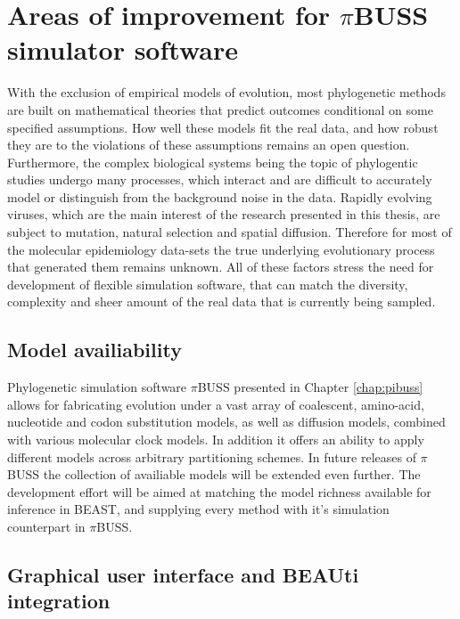 \section{Areas of improvement for $\pi$BUSS simulator software}

With the exclusion of empirical models of evolution, most phylogenetic methods are built on mathematical theories that predict outcomes conditional on some specified assumptions.
How well these models fit the real data, and how robust they are to the violations of these assumptions remains an open question.
Furthermore, the complex biological systems being the topic of phylogentic studies undergo many processes, which interact and are difficult to accurately model or distinguish from the background noise in the data.
Rapidly evolving viruses, which are the main interest of the research presented in this thesis, are subject to mutation, natural selection and spatial diffusion.
Therefore for most of the molecular epidemiology data-sets the true underlying evolutionary process that generated them remains unknown.
All of these factors stress the need for development of flexible simulation software, that can match the diversity, complexity and sheer amount of the real data that is currently being sampled.

\subsection{Model availiability}

Phylogenetic simulation software $\pi$BUSS presented in Chapter \ref{chap:pibuss} allows for fabricating evolution under a vast array of coalescent, amino-acid, nucleotide and codon substitution models, as well as diffusion models, combined with various molecular clock models.
In addition it offers an ability to apply different models across arbitrary partitioning schemes.
In future releases of $\pi$BUSS the collection of availiable models will be extended even further.
The development effort will be aimed at matching the model richness available for inference in BEAST, and supplying every method with it's simulation counterpart in $\pi$BUSS.


\subsection{Graphical user interface and BEAUti integration}

